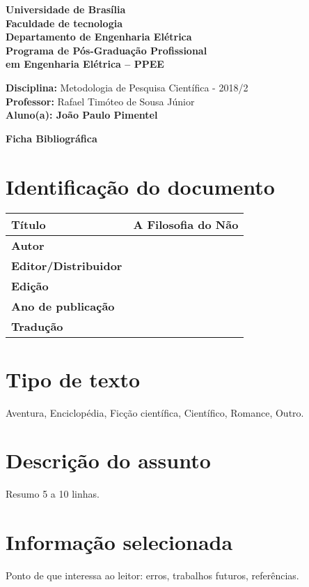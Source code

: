 \documentclass[11pt]{article}
\begin{document}
\noindent
\begin{center}
\Large\textbf{Universidade de Brasília}\\
\Large\textbf{Faculdade de tecnologia}\\
\Large\textbf{Departamento de Engenharia Elétrica}\\
\Large\textbf{Programa de Pós-Graduação Profissional \\
	em Engenharia Elétrica -- PPEE}\\
\end{center}

\large{
\noindent
\textbf{Disciplina:} Metodologia de Pesquisa Científica - 2018/2\\
\textbf{Professor:} Rafael Timóteo de Sousa Júnior \\
\textbf{Aluno(a): João Paulo Pimentel}}\\

\begin{center}
\Large\textbf{Ficha Bibliográfica}
\end{center}
\normalsize

\section{Identificação do documento}
\begin{center}
	\begin{tabular}{|l|l|} \hline
		\textbf{Título} & A Filosofia do Não\cite{Bachelard1979} \\ \hline
		\textbf{Autor} &  \\ \hline
		\textbf{Editor/Distribuidor} & \\ \hline
		\textbf{Edição} &  \\ \hline
		\textbf{Ano de publicação} & \\ \hline
		\textbf{Tradução} &  \\ \hline
	\end{tabular}
\end{center}

\section{Tipo de texto}
Aventura, Enciclopédia, Ficção científica, Científico, Romance, Outro.

\section{Descrição do assunto}
Resumo 5 a 10 linhas.

\section{Informação selecionada}
Ponto de que interessa ao leitor: erros, trabalhos futuros, referências.



\end{document}

